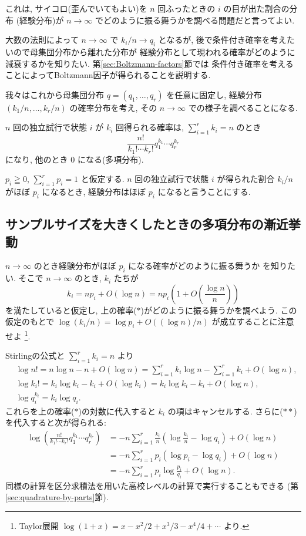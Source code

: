 \documentclass[12pt,twoside]{jarticle}
\theoremstyle{jplain}
\theoremstyle{jplain}
\theoremstyle{jplain}
\numberwithin{theorem}{section}
\numberwithin{equation}{section}
\numberwithin{figure}{section}
\numberwithin{table}{section}
\newcommand\secref[1]{第\ref{#1}節}
\begin{document}
これは, サイコロ(歪んでいてもよい)を $n$ 回ふったときの $i$ の目が出た割合の分布
(経験分布)が $n\to\infty$ でどのように振る舞うかを調べる問題だと言ってよい.

大数の法則によって $n\to\infty$ で $k_i/n\to q_i$ となるが,
後で条件付き確率を考えたいので母集団分布から離れた分布が
経験分布として現われる確率がどのように減衰するかを知りたい.
\secref{sec:Boltzmann-factors}では
条件付き確率を考えることによってBoltzmann因子が得られることを説明する.

我々はこれから母集団分布 $q=(q_1,\ldots,q_r)$ を任意に固定し,
経験分布 $(k_1/n,\ldots,k_r/n)$ の確率分布を考え,
その $n\to\infty$ での様子を調べることになる.

$n$ 回の独立試行で状態 $i$ が $k_i$ 回得られる確率は,
$\sum_{i=1}^r k_i=n$ のとき
\[
\frac{n!}{k_1!\cdots k_r!} q_1^{k_1}\cdots q_r^{k_r}
\tag{$*$}
\]
になり, 他のとき $0$ になる(多項分布).

$p_i\geqq 0$, $\sum_{i=1}^r p_i=1$ と仮定する.
$n$ 回の独立試行で状態 $i$ が得られた割合 $k_i/n$ がほぼ $p_i$ になるとき,
経験分布はほぼ $p_i$ になると言うことにする.


\subsection{サンプルサイズを大きくしたときの多項分布の漸近挙動}
\label{sec:log}

$n\to\infty$ のとき経験分布がほぼ $p_i$ になる確率がどのように振る舞うか
を知りたい. そこで $n\to\infty$ のとき, $k_i$ たちが
\[
k_i= np_i+O(\log n) = np_i\left(1 + O\left(\frac{\log n}{n}\right)\right)
\tag{$**$}
\]
を満たしていると仮定し, 上の確率($*$)がどのように振る舞うかを調べよう.
この仮定のもとで $\log(k_i/n)=\log p_i+O((\log n)/n)$ が成立することに注意せよ%
\footnote{Taylor展開 $\log(1+x)=x-x^2/2+x^3/3-x^4/4+\cdots$ より.}.

Stirlingの公式と $\sum_{i=1}^r k_i=n$ より
\begin{align*}
&
\log n!
= n\log n - n + O(\log n)
= \sum_{i=1}^r k_i\log n - \sum_{i=1}^r k_i + O(\log n),
\\ &
\log k_i!
= k_i\log k_i - k_i + O(\log k_i)
= k_i\log k_i - k_i + O(\log n),
\\ &
\log q_i^{k_i} = k_i\log q_i.
\end{align*}
これらを上の確率($*$)の対数に代入すると $k_i$ の項はキャンセルする.
さらに($**$)を代入すると次が得られる:
\begin{align*}
\log\left(\frac{n!}{k_1!\cdots k_r!} q_1^{k_1}\cdots q_r^{k_r}\right)
&
=
- n\sum_{i=1}^r \frac{k_i}{n}\left(\log\frac{k_i}{n}-\log q_i\right)
+ O(\log n)
\\ &
= -n\sum_{i=1}^r p_i(\log p_i - \log q_i)+O(\log n)
\\ &
= -n\sum_{i=1}^r p_i\log\frac{p_i}{q_i}+O(\log n).
\end{align*}
同様の計算を区分求積法を用いた高校レベルの計算で実行することもできる
(\secref{sec:quadrature-by-parts}).
\end{document}
